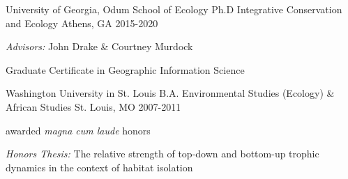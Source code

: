

\begin{cventries}

  \expentry
  	{University of Georgia, Odum School of Ecology} %
    {Ph.D Integrative Conservation and Ecology} %
    {Athens, GA} %
    {2015-2020} %
	{
      \begin{cvitems} %
      \item{\textit{Advisors:} John Drake \& Courtney Murdock}
      \item{Graduate Certificate in Geographic Information Science}
      \end{cvitems}
    }

   \expentry
    {Washington University in St. Louis} %
    {B.A. Environmental Studies (Ecology) \& African Studies} %
    {St. Louis, MO} %
    {2007-2011} %
    {
      \begin{cvitems} %
      	\item {awarded \textit{magna cum laude} honors}
        \item { \textit{Honors Thesis:} The relative strength of top-down and bottom-up trophic dynamics in the context of habitat isolation}
      \end{cvitems}
    }

\end{cventries}
